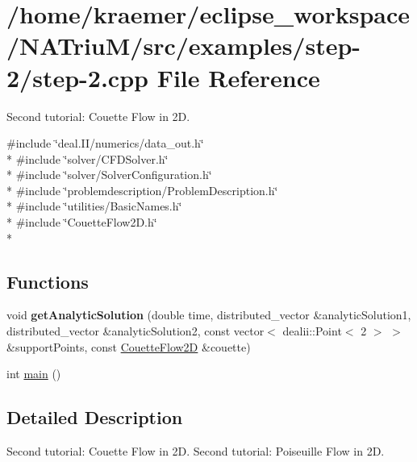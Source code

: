 \hypertarget{step-2_8cpp}{\section{/home/kraemer/eclipse\-\_\-workspace/\-N\-A\-Triu\-M/src/examples/step-\/2/step-\/2.cpp File Reference}
\label{step-2_8cpp}
}


Second tutorial\-: Couette Flow in 2\-D.  


{\ttfamily \#include \char`\"{}deal.\-I\-I/numerics/data\-\_\-out.\-h\char`\"{}}\\*
{\ttfamily \#include \char`\"{}solver/\-C\-F\-D\-Solver.\-h\char`\"{}}\\*
{\ttfamily \#include \char`\"{}solver/\-Solver\-Configuration.\-h\char`\"{}}\\*
{\ttfamily \#include \char`\"{}problemdescription/\-Problem\-Description.\-h\char`\"{}}\\*
{\ttfamily \#include \char`\"{}utilities/\-Basic\-Names.\-h\char`\"{}}\\*
{\ttfamily \#include \char`\"{}Couette\-Flow2\-D.\-h\char`\"{}}\\*
\subsection*{Functions}
\begin{DoxyCompactItemize}
\item 
\hypertarget{step-2_8cpp_a158e222b54006afe50d05736cc2a1000}{void {\bfseries get\-Analytic\-Solution} (double time, distributed\-\_\-vector \&analytic\-Solution1, distributed\-\_\-vector \&analytic\-Solution2, const vector$<$ dealii\-::\-Point$<$ 2 $>$ $>$ \&support\-Points, const \hyperlink{classnatrium_1_1CouetteFlow2D}{Couette\-Flow2\-D} \&couette)}\label{step-2_8cpp_a158e222b54006afe50d05736cc2a1000}

\item 
int \hyperlink{step-2_8cpp_ae66f6b31b5ad750f1fe042a706a4e3d4}{main} ()
\end{DoxyCompactItemize}


\subsection{Detailed Description}
Second tutorial\-: Couette Flow in 2\-D. Second tutorial\-: Poiseuille Flow in 2\-D.

